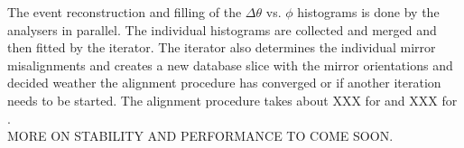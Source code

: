 The event reconstruction and filling of the $\Delta \theta$ vs. $\phi$ histograms is done by the analysers in parallel. The individual histograms are collected and merged and then fitted by the iterator. The iterator also determines the individual mirror misalignments and creates a new database slice with the mirror orientations and decided weather the alignment procedure has converged or if another iteration needs to be started. The alignment procedure takes about XXX for \richone and XXX for \richtwo.\\
MORE ON STABILITY AND PERFORMANCE TO COME SOON.\\
